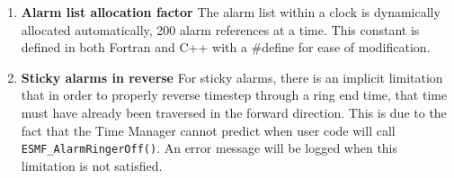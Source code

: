 
\begin{enumerate}

\item {\bf Alarm list allocation factor}  The alarm list within a clock is
dynamically allocated automatically, 200 alarm references at a time.
This constant is defined in both Fortran and C++ with a \#define for ease
of modification.

\item {\bf Sticky alarms in reverse}  For sticky alarms, there is an implicit
limitation that in order to properly reverse timestep through a ring end
time, that time must have already been traversed in the forward direction.
This is due to the fact that the Time Manager cannot predict when user code
will call {\tt ESMF\_AlarmRingerOff()}.  An error message will be logged when
this limitation is not satisfied.

\end{enumerate}
